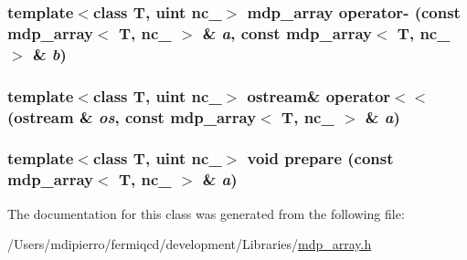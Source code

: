\label{classmdp__array_a0456c0c6d5e305cc0799ceb7b8639539}
\hypertarget{classmdp__array_a97528690c485585f95cfad74e934e621}{
\subsubsection[{operator-\/}]{\setlength{\rightskip}{0pt plus 5cm}template$<$class T, uint nc\_\-$>$ {\bf mdp\_\-array} operator-\/ (const {\bf mdp\_\-array}$<$ T, nc\_\- $>$ \& {\em a}, \/  const {\bf mdp\_\-array}$<$ T, nc\_\- $>$ \& {\em b})}}
\label{classmdp__array_a97528690c485585f95cfad74e934e621}
\hypertarget{classmdp__array_a5b84c698961f9276308a57923daf4458}{
\subsubsection[{operator$<$$<$}]{\setlength{\rightskip}{0pt plus 5cm}template$<$class T, uint nc\_\-$>$ ostream\& operator$<$$<$ (ostream \& {\em os}, \/  const {\bf mdp\_\-array}$<$ T, nc\_\- $>$ \& {\em a})}}
\label{classmdp__array_a5b84c698961f9276308a57923daf4458}
\hypertarget{classmdp__array_a7c12113e8b61f3906ff4d15a6cc10fe2}{
\subsubsection[{prepare}]{\setlength{\rightskip}{0pt plus 5cm}template$<$class T, uint nc\_\-$>$ void prepare (const {\bf mdp\_\-array}$<$ T, nc\_\- $>$ \& {\em a})}}
\label{classmdp__array_a7c12113e8b61f3906ff4d15a6cc10fe2}


The documentation for this class was generated from the following file:\begin{DoxyCompactItemize}
\item 
/Users/mdipierro/fermiqcd/development/Libraries/\hyperlink{mdp__array_8h}{mdp\_\-array.h}\end{DoxyCompactItemize}
